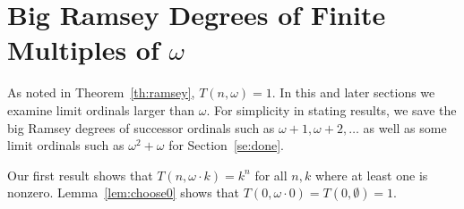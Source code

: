 \documentclass[11pt]{article}
\newcommand{\om}{\omega}
\newcommand{\numpoints}{n}
\theoremstyle{plain}
\theoremstyle{definition}
\begin{document}
\section{Big Ramsey Degrees of Finite Multiples of \texorpdfstring{$\om$}{omega}}\label{se:aomega} 

As noted in Theorem~\ref{th:ramsey}, $T(\numpoints,\omega)=1$.
In this and later sections we examine limit ordinals larger than $\omega$.
For simplicity in stating results, we save the big
Ramsey degrees of successor ordinals such as $\om + 1, \om+2, \ldots$ as well as some limit ordinals such as $\om^2 + \om$ for 
Section~\ref{se:done}.

Our first result shows that $T(\numpoints, \omega \cdot k) = k^{\numpoints}$ for all $\numpoints,k$ where at least one is nonzero. %
Lemma~\ref{lem:choose0} shows that %
$T(0, \omega \cdot 0) = T(0, \emptyset) = 1$.
\end{document}

